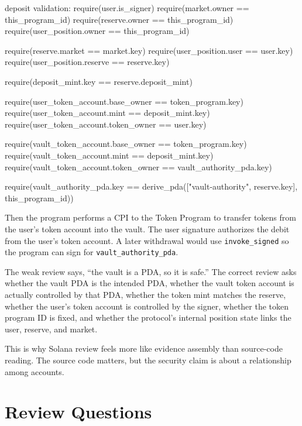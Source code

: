 \begin{codeblock}
deposit validation:
    require(user.is_signer)
    require(market.owner == this_program_id)
    require(reserve.owner == this_program_id)
    require(user_position.owner == this_program_id)

    require(reserve.market == market.key)
    require(user_position.user == user.key)
    require(user_position.reserve == reserve.key)

    require(deposit_mint.key == reserve.deposit_mint)

    require(user_token_account.base_owner == token_program.key)
    require(user_token_account.mint == deposit_mint.key)
    require(user_token_account.token_owner == user.key)

    require(vault_token_account.base_owner == token_program.key)
    require(vault_token_account.mint == deposit_mint.key)
    require(vault_token_account.token_owner == vault_authority_pda.key)

    require(vault_authority_pda.key ==
        derive_pda(["vault-authority", reserve.key], this_program_id))
\end{codeblock}

Then the program performs a CPI to the Token Program to transfer tokens from the user's token account into the vault. The user signature authorizes the debit from the user's token account. A later withdrawal would use \texttt{invoke\_signed} so the program can sign for \texttt{vault\_authority\_pda}.

The weak review says, ``the vault is a PDA, so it is safe.'' The correct review asks whether the vault PDA is the intended PDA, whether the vault token account is actually controlled by that PDA, whether the token mint matches the reserve, whether the user's token account is controlled by the signer, whether the token program ID is fixed, and whether the protocol's internal position state links the user, reserve, and market.

This is why Solana review feels more like evidence assembly than source-code reading. The source code matters, but the security claim is about a relationship among accounts.

\section*{Review Questions}


